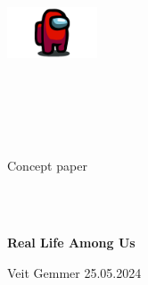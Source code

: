 \author{Veit Gemmer}
\date{\today}

\begin{center}
\includegraphics[height=1.5cm]{graphics/among_us.png}
\end{center}
\begin{verbatim}





\end{verbatim}
\begin{center}
    \Large{Concept paper}
\end{center}
\begin{verbatim}



\end{verbatim}
\begin{center}
    \textbf{\Large{Real Life Among Us}}
\end{center}
\vfill
\begin{center}
    Veit Gemmer
    25.05.2024
    \begin{verbatim}



    \end{verbatim}
\end{center}

